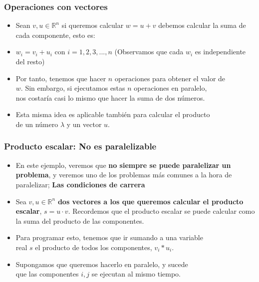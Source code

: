 \documentclass[aspectratio=169]{beamer}
\begin{document}
\begin{frame}[fragile]
	\frametitle{Operaciones con vectores}
	
	\begin{itemize}
		\item Sean $v, u \in \mathbb{R}^n$ si queremos calcular $w=u+v$ debemos calcular la suma de cada componente, esto es:
		\pause
		\item $w_i = v_i + u_i$ con $i = 1, 2, 3, ..., n$ (Observamos que cada $w_i$ es independiente del resto)
		\pause
		\item Por tanto, tenemos que hacer $n$ operaciones para obtener el valor de \\$w$. Sin embargo, si ejecutamos estas $n$ operaciones en paralelo, \\nos costaría casi lo mismo que hacer la suma de dos números.
		\pause
		\item Esta misma idea es aplicable también para calcular el producto \\de un número $\lambda$ y un vector $u$.
	\end{itemize}
\end{frame}


\begin{frame}[fragile]
	\frametitle{Producto escalar: No es paralelizable}
	
	\begin{itemize}
		\item En este ejemplo, veremos que \textbf{no siempre se puede paralelizar un problema}, y veremos uno de los problemas más comunes a la hora de paralelizar; \textbf{Las condiciones de carrera}
		\pause
		\item Sea $v, u \in \mathbb{R}^n$ \textbf{dos vectores a los que queremos calcular el producto escalar}, $s=u \cdot v$. Recordemos que el producto escalar se puede calcular como \\la suma del producto de las componentes.
		\pause
		\item Para programar esto, tenemos que ir sumando a una variable\\real $s$ el producto de todos los componentes, $v_i * u_i$.
		\pause
		\item Supongamos que queremos hacerlo en paralelo, y sucede \\que las componentes $i, j$ se ejecutan al mismo tiempo.
	\end{itemize}
\end{frame}
\end{document}
